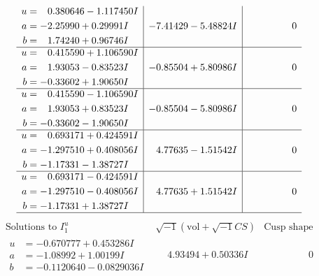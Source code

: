 \documentclass[1p]{elsarticle_modified}
\theoremstyle{definition}
\newcommand{\I}{\sqrt{-1}}
\begin{document}
$$\begin{array}{c|c|c}
\begin{aligned}
u &= \phantom{-}0.380646 - 1.117450 I \\
a &= -2.25990 + 0.29991 I \\
b &= \phantom{-}1.74240 + 0.96746 I\end{aligned}
 & -7.41429 - 5.48824 I & \phantom{-0.000000 } 0 \\ \hline\begin{aligned}
u &= \phantom{-}0.415590 + 1.106590 I \\
a &= \phantom{-}1.93053 - 0.83523 I \\
b &= -0.33602 + 1.90650 I\end{aligned}
 & -0.85504 + 5.80986 I & \phantom{-0.000000 } 0 \\ \hline\begin{aligned}
u &= \phantom{-}0.415590 - 1.106590 I \\
a &= \phantom{-}1.93053 + 0.83523 I \\
b &= -0.33602 - 1.90650 I\end{aligned}
 & -0.85504 - 5.80986 I & \phantom{-0.000000 } 0 \\ \hline\begin{aligned}
u &= \phantom{-}0.693171 + 0.424591 I \\
a &= -1.297510 + 0.408056 I \\
b &= -1.17331 - 1.38727 I\end{aligned}
 & \phantom{-}4.77635 - 1.51542 I & \phantom{-0.000000 } 0 \\ \hline\begin{aligned}
u &= \phantom{-}0.693171 - 0.424591 I \\
a &= -1.297510 - 0.408056 I \\
b &= -1.17331 + 1.38727 I\end{aligned}
 & \phantom{-}4.77635 + 1.51542 I & \phantom{-0.000000 } 0\\
 \hline 
 \end{array}$$\newpage$$\begin{array}{c|c|c}  
\text{Solutions to }I^u_{1}& \I (\text{vol} + \sqrt{-1}CS) & \text{Cusp shape}\\
 \hline 
\begin{aligned}
u &= -0.670777 + 0.453286 I \\
a &= -1.08992 + 1.00199 I \\
b &= -0.1120640 - 0.0829036 I\end{aligned}
 & \phantom{-}4.93494 + 0.50336 I & \phantom{-0.000000 } 0 \\ \hline\begin{aligned}

\end{aligned}
\end{array}$$
\end{document}
